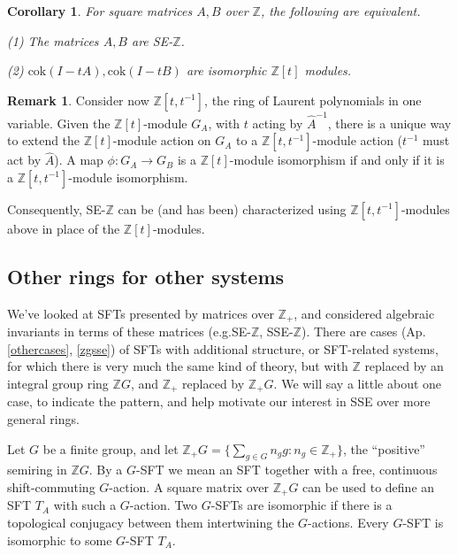 \documentclass{amsart}
\newtheorem{coro}[equation]{Corollary}
\theoremstyle{definition}
\newtheorem{rem}[equation]{Remark}
\theoremstyle{definition}
\newcommand{\red}[1]{\textcolor{red}{#1}}
\newcommand{\Z}{\mathbb Z}
\numberwithin{equation}{subsection}
\begin{document}
\begin{coro}  For square matrices $A,B$ over $\Z$, the following are equivalent.

      (1) The matrices $A,B$ are SE-$\Z$.

      (2)       $\text{cok}(I-tA), \text{cok}(I-tB)$
      are isomorphic $\Z [t]$ modules.
\end{coro}
\begin{rem} \label{LaurentRemark}   Consider now  $\Z[t,t^{-1}]$,
the ring of Laurent polynomials
in one variable.  Given the $\Z[t]$-module $G_A$, with $t$ acting by
$\hat A^{-1}$, there is a unique way to extend the $\Z[t]$-module action
on $G_A$ to a
$\Z[t,t^{-1}]$-module action ($t^{-1}$ must act by $\hat A$).
A map $\phi: G_A\to G_B$ is a $\Z[t]$-module isomorphism if and only if
it is a $\Z[t,t^{-1}]$-module isomorphism.

Consequently, SE-$\Z$ can be (and has been)  characterized using
$\Z[t,t^{-1}]$-modules above in place of the $\Z[t]$-modules.
\end{rem}



\subsection{Other rings for other systems}
\label{subsec:otherrings}

   We've looked at SFTs presented by matrices over $\Z_+$,
   and considered algebraic invariants in terms of these
   matrices (e.g.SE-$\Z$, SSE-$\Z$).
   There are cases  (Ap. \ref{othercases}, \ref{zgsse})
of SFTs with additional structure, or
   SFT-related systems, for which there is very much
   the same kind of theory, but with $\Z$ replaced by
   an integral group ring $\Z G$, and $\Z_+$
   replaced by $\Z_+G$. We will say  a
   little about one case, to indicate the pattern,
   and help motivate our interest in SSE over more
   general rings.


Let $G$ be a  finite group, and let $\Z_+G
 = \{ \sum_{g\in G} n_g g: n_g \in \Z_+ \}$,
 the
``positive'' semiring in $\Z G$.
By a  $G$-SFT we mean  an SFT together with a
free, continuous shift-commuting $G$-action.
A square matrix over $\Z_+G$ can be used to define an
SFT $T_A$ with such a  $G$-action.
Two $G$-SFTs  are isomorphic if there
is a topological conjugacy between them intertwining
the $G$-actions.
Every $G$-SFT is isomorphic to some $G$-SFT $T_A$.
\end{document}
